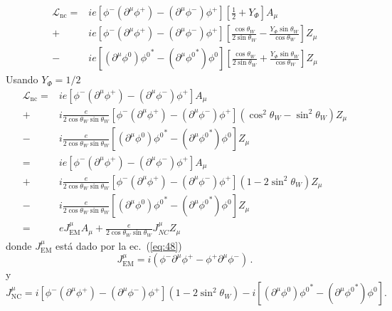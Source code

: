 \begin{align}
  \mathcal{L}_\text{nc}=&ie\left[\phi^- \left(\partial^\mu\phi^+\right)-\left(\partial^\mu\phi^-\right) \phi^+\right]
                    \left[\frac{1}{2}+{Y_\Phi}\right]A_\mu\nonumber\\
                    +&ie\left[\phi^- \left(\partial^\mu\phi^+\right)-\left(\partial^\mu\phi^-\right) \phi^+\right]\left[\frac{\cos\theta_W}{2\sin\theta_W}-\frac{Y_\Phi\sin\theta_W}{\cos\theta_W}\right]Z_\mu\nonumber\\
                    -&ie\left[\left(\partial^\mu\phi^0\right){\phi^0}^*-\left(\partial^\mu{\phi^0}^*\right)\phi^0\right]\left[\frac{\cos\theta_W}{2\sin\theta_W}+\frac{Y_\Phi\sin\theta_W}{\cos\theta_W}\right]Z_\mu
\end{align}
Usando $Y_\Phi=1/2$
\begin{align}
\label{eq:187}
  \mathcal{L}_\text{nc}=&ie\left[\phi^- \left(\partial^\mu\phi^+\right)-\left(\partial^\mu\phi^-\right) \phi^+\right]
                   A_\mu\nonumber\\
                    +&i\frac{e}{2\cos\theta_W\sin\theta_W}\left[\phi^- \left(\partial^\mu\phi^+\right)-\left(\partial^\mu\phi^-\right) \phi^+\right]\left(\cos^2\theta_W-\sin^2\theta_W\right)Z_\mu\nonumber\\
                    -&i\frac{e}{2\cos\theta_W\sin\theta_W}\left[\left(\partial^\mu\phi^0\right){\phi^0}^*-\left(\partial^\mu{\phi^0}^*\right)\phi^0\right]Z_\mu\nonumber\\
=&ie\left[\phi^- \left(\partial^\mu\phi^+\right)-\left(\partial^\mu\phi^-\right) \phi^+\right]
                   A_\mu\nonumber\\
                    +&i\frac{e}{2\cos\theta_W\sin\theta_W}\left[\phi^- \left(\partial^\mu\phi^+\right)-\left(\partial^\mu\phi^-\right) \phi^+\right]\left(1-2\sin^2\theta_W\right)Z_\mu\nonumber\\
                    -&i\frac{e}{2\cos\theta_W\sin\theta_W}\left[\left(\partial^\mu\phi^0\right){\phi^0}^*-\left(\partial^\mu{\phi^0}^*\right)\phi^0\right]Z_\mu\nonumber\\
=&eJ^\mu_{\text{EM}}A_\mu+\frac{e}{2\cos\theta_W\sin\theta_W}J^\mu_{NC}Z_\mu
\end{align}
donde $J^\mu_{\text{EM}}$ est\'a dado por la ec.~(\ref{eq:48})
\begin{equation}
  \label{eq:191}
    J^\mu_{\text{EM}}= i(\phi^-\partial^\mu\phi^+-\phi^+\partial^\mu\phi^-)\,.
\end{equation}
 y
\begin{equation}
  J^\mu_{\text{NC}}=i\left[\phi^- \left(\partial^\mu\phi^+\right)-\left(\partial^\mu\phi^-\right) \phi^+\right](1-2\sin^2\theta_W )-i\left[\left(\partial^\mu\phi^0\right){\phi^0}^*-\left(\partial^\mu{\phi^0}^*\right)\phi^0\right].
\end{equation}

